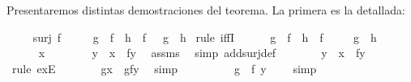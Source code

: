\begin{isabellebody}
\begin{isamarkuptext}
Presentaremos distintas demostraciones del teorema. La primera es la
 detallada:%
\end{isamarkuptext}\isamarkuptrue%
\isamarkupfalse%
\ \isanewline
\ \ \ {\isachardoublequoteopen}surj\ f{\isachardoublequoteclose}\ \isanewline
\ \ \ {\isachardoublequoteopen}{\isacharparenleft}\ g\ {\isasymcirc}\ f\ {\isacharequal}\ h\ {\isasymcirc}\ f\ {\isacharparenright}\ {\isacharequal}\ {\isacharparenleft}g\ {\isacharequal}\ h{\isacharparenright}{\isachardoublequoteclose}\isanewline
%
\isadelimproof
%
\endisadelimproof
%
\isatagproof
{}\isamarkupfalse%
\ {\isacharparenleft}rule\ iffI{\isacharparenright}\isanewline
\ \ \isamarkupfalse%
\ {}{\isacharcolon}\ {\isachardoublequoteopen}\ g\ {\isasymcirc}\ f\ {\isacharequal}\ h\ {\isasymcirc}\ f\ {\isachardoublequoteclose}\isanewline
\ \ \isamarkupfalse%
\ {\isachardoublequoteopen}g\ {\isacharequal}\ h{\isachardoublequoteclose}\ \isanewline
\ \ \isamarkupfalse%
\ \isanewline
\ \ \ \ \isamarkupfalse%
\ x\ \isanewline
\ \ \ \ \isamarkupfalse%
\ {\isachardoublequoteopen}\ {\isasymexists}y\ {\isachardot}\ x\ {\isacharequal}\ f{\isacharparenleft}y{\isacharparenright}{\isachardoublequoteclose}\ \isamarkupfalse%
\ assms\ \isamarkupfalse%
\ {\isacharparenleft}simp\ add{\isacharcolon}surj{\isacharunderscore}def{\isacharparenright}\isanewline
\ \ \ \ \isamarkupfalse%
\ \isamarkupfalse%
\ {\isachardoublequoteopen}y{\isachardoublequoteclose}\ \ {}{\isacharcolon}{\isachardoublequoteopen}x\ {\isacharequal}\ f{\isacharparenleft}y{\isacharparenright}{\isachardoublequoteclose}\ \isamarkupfalse%
\ {\isacharparenleft}rule\ exE{\isacharparenright}\isanewline
\ \ \ \ \isamarkupfalse%
\ \isamarkupfalse%
\ {\isachardoublequoteopen}g{\isacharparenleft}x{\isacharparenright}\ {\isacharequal}\ g{\isacharparenleft}f{\isacharparenleft}y{\isacharparenright}{\isacharparenright}{\isachardoublequoteclose}\ \isamarkupfalse%
\ simp\isanewline
\ \ \ \ \isamarkupfalse%
\ \isamarkupfalse%
\ {\isachardoublequoteopen}{\isachardot}{\isachardot}{\isachardot}\ {\isacharequal}\ {\isacharparenleft}g\ {\isasymcirc}\ f{\isacharparenright}\ {\isacharparenleft}y{\isacharparenright}\ \ {\isachardoublequoteclose}\ \isamarkupfalse%
\ simp\isanewline
\ \ \ \ \isamarkupfalse%

\end{isabellebody}
